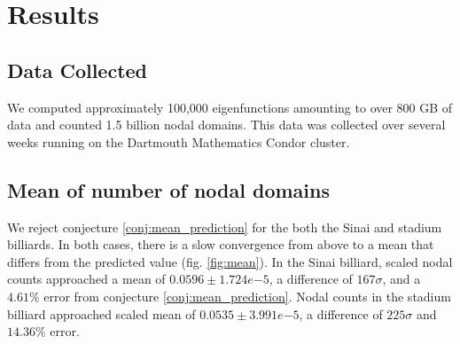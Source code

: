 \documentclass{report}
\begin{document}
\chapter{Results}

\section{Data Collected}
We computed approximately 100,000 eigenfunctions amounting to over 800 GB of data and counted 1.5 billion nodal domains. This data was collected over several weeks running on the Dartmouth Mathematics Condor cluster.

\section{Mean of number of nodal domains}
We reject conjecture \ref{conj:mean_prediction} for the both the Sinai and stadium billiards. In both cases, there is a slow convergence from above to a mean that differs from the predicted value (fig. \ref{fig:mean}). In the Sinai billiard, scaled nodal counts approached a mean of $0.0596 \pm 1.724e{-5}$, a difference of $167 \sigma$, and a $4.61\%$ error from conjecture \ref{conj:mean_prediction}. Nodal counts in the stadium billiard approached scaled mean of $0.0535 \pm 3.991e{-5}$, a difference of $225 \sigma$ and $14.36\%$ error.
\end{document}

